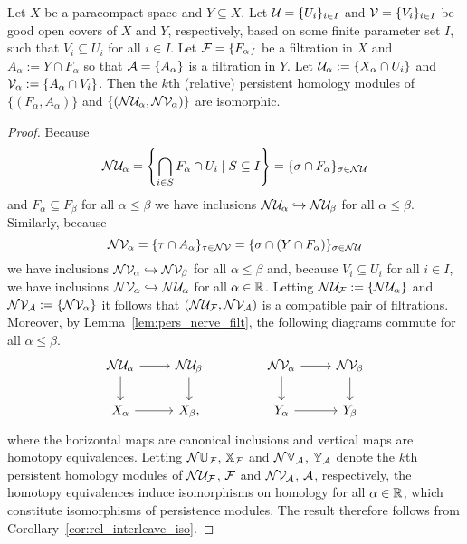 \begin{lemma}
  Let $X$ be a paracompact space and $Y\subseteq X$.
  Let $\mathcal{U} = \{U_i\}_{i\in I}$ and $\mathcal{V} = \{V_i\}_{i\in I}$ be good open covers of $X$ and $Y$, respectively, based on some finite parameter set $I$, such that $V_i\subseteq U_i$ for all $i\in I$.
  Let $\mathcal{F} = \{F_\alpha\}$ be a filtration in $X$ and $A_\alpha := Y\cap F_\alpha$ so that $\mathcal{A} = \{A_\alpha\}$ is a filtration in $Y$.
  Let $\mathcal{U}_\alpha := \{X_\alpha\cap U_i\}$ and $\mathcal{V}_\alpha := \{A_\alpha\cap V_i\}$.
  Then the $k$th (relative) persistent homology modules of $\{(F_\alpha, A_\alpha)\}$ and $\{(\mathcal{N}\mathcal{U}_\alpha, \mathcal{N}\mathcal{V}_\alpha)\}$ are isomorphic.
\end{lemma}
\begin{proof}
  Because
  \[\mathcal{N}\mathcal{U}_\alpha = \left\{\bigcap_{i\in S} F_\alpha\cap U_i\mid S\subseteq I\right\} = \{\sigma\cap F_\alpha\}_{\sigma\in \mathcal{N}\mathcal{U}}\]
  and $F_\alpha\subseteq F_\beta$ for all $\alpha\leq\beta$ we have inclusions $\mathcal{N}\mathcal{U}_\alpha\hookrightarrow\mathcal{N}\mathcal{U}_\beta$ for all $\alpha\leq\beta$.
  Similarly, because
  \[\mathcal{N}\mathcal{V}_\alpha = \{\tau\cap A_\alpha\}_{\tau\in \mathcal{N}\mathcal{V}} = \{\sigma\cap (Y\cap F_\alpha)\}_{\sigma\in\mathcal{N}\mathcal{U}}\]
  we have inclusions $\mathcal{N}\mathcal{V}_\alpha\hookrightarrow\mathcal{N}\mathcal{V}_\beta$ for all $\alpha\leq\beta$ and, because $V_i\subseteq U_i$ for all $i\in I$, we have inclusions $\mathcal{N}\mathcal{V}_\alpha\hookrightarrow \mathcal{N}\mathcal{U}_\alpha$ for all $\alpha\in\mathbb{R}$.
  Letting $\mathcal{N}\mathcal{U}_{\mathcal{F}} := \{\mathcal{N}\mathcal{U}_\alpha\}$ and $\mathcal{N}\mathcal{V}_{\mathcal{A}} := \{\mathcal{N}\mathcal{V}_\alpha\}$ it follows that $(\mathcal{N}\mathcal{U}_{\mathcal{F}}, \mathcal{N}\mathcal{V}_{\mathcal{A}})$ is a compatible pair of filtrations.
  Moreover, by Lemma~\ref{lem:pers_nerve_filt}, the following diagrams commute for all $\alpha\leq\beta$.
  \[\begin{tikzcd}
      \N\cU_\alpha \arrow{r}\arrow{d} &
      \N\cU_\beta \arrow{d}\\
      X_\alpha\arrow{r} &
      X_\beta,
    \end{tikzcd}\hspace{10ex}
    \begin{tikzcd}
      \N\cV_\alpha \arrow{r}\arrow{d} &
      \N\cV_\beta \arrow{d}\\
      Y_\alpha\arrow{r} &
      Y_\beta
    \end{tikzcd}\]
  where the horizontal maps are canonical inclusions and vertical maps are homotopy equivalences.
  Letting $\mathcal{N}\mathbb{U}_{\mathcal{F}}$, $\mathbb{X}_{\mathcal{F}}$ and $\mathcal{N}\mathbb{V}_{\mathcal{A}}$, $\mathbb{Y}_{\mathcal{A}}$ denote the $k$th persistent homology modules of $\mathcal{N}\mathcal{U}_{\mathcal{F}}$, $\mathcal{F}$ and $\mathcal{N}\mathcal{V}_{\mathcal{A}}$, $\mathcal{A}$, respectively, the homotopy equivalences induce isomorphisms on homology for all $\alpha\in\mathbb{R}$, which constitute isomorphisms of persistence modules.
  The result therefore follows from Corollary~\ref{cor:rel_interleave_iso}.
\end{proof}


